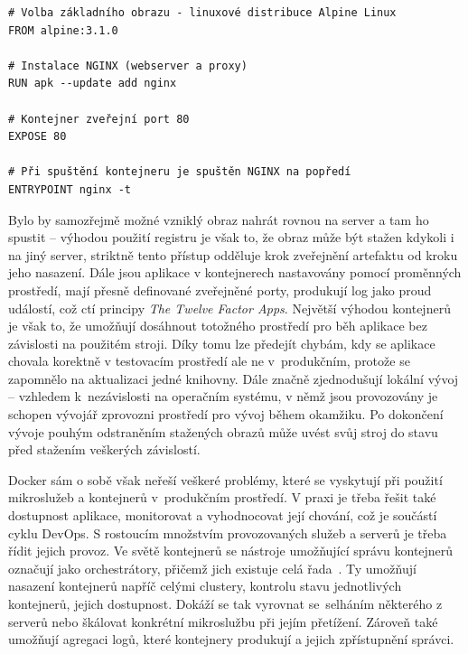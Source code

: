 \documentclass[FM,DP]{tulthesis}
\newenvironment{code}
    {\filbreak\captionsetup{type=listing}}{\filbreak}
\begin{document}
\begin{code}
\captionsetup{singlelinecheck=false,justification=raggedright}
\label{code:dockerfile}
\begin{verbatim}
# Volba základního obrazu - linuxové distribuce Alpine Linux
FROM alpine:3.1.0

# Instalace NGINX (webserver a proxy)
RUN apk --update add nginx

# Kontejner zveřejní port 80
EXPOSE 80

# Při spuštění kontejneru je spuštěn NGINX na popředí
ENTRYPOINT nginx -t
\end{verbatim}
\end{code}

Bylo by samozřejmě možné vzniklý obraz nahrát rovnou na server a tam ho spustit -- výhodou použití registru je však
to, že obraz může být stažen kdykoli i na jiný server, striktně tento přístup odděluje krok zveřejnění artefaktu
od kroku jeho nasazení. Dále jsou aplikace v kontejnerech nastavovány pomocí proměnných prostředí, mají přesně 
definované zveřejněné porty, produkují log jako proud událostí, což ctí principy \textit{The Twelve Factor Apps}. 
Největší výhodou kontejnerů je však to, že umožňují dosáhnout totožného prostředí pro běh aplikace bez závislosti 
na použitém stroji. Díky tomu lze předejít chybám, kdy se aplikace chovala korektně v testovacím prostředí ale ne 
v~produkčním, protože se zapomnělo na aktualizaci jedné knihovny. Dále značně zjednodušují lokální vývoj -- vzhledem 
k~nezávislosti na operačním systému, v němž jsou provozovány je schopen vývojář zprovozni prostředí pro vývoj během 
okamžiku. Po dokončení vývoje pouhým odstraněním stažených obrazů může uvést svůj stroj do stavu před stažením 
veškerých závislostí.

Docker sám o sobě však neřeší veškeré problémy, které se vyskytují při použití mikroslužeb a kontejnerů v~produkčním
prostředí. V praxi je třeba řešit také dostupnost aplikace, monitorovat a vyhodnocovat její chování, což je součástí
cyklu DevOps. S rostoucím množstvím provozovaných služeb a serverů je třeba řídit jejich provoz. Ve světě kontejnerů
se nástroje umožňující správu kontejnerů označují jako orchestrátory, přičemž jich existuje celá řada~\cite[strana~123]{orchestration}. Ty umožňují nasazení kontejnerů napříč celými clustery, kontrolu stavu jednotlivých kontejnerů, 
jejich dostupnost. Dokáží se tak vyrovnat se~selháním některého z serverů nebo škálovat konkrétní mikroslužbu při
jejím přetížení. Zároveň také umožňují agregaci logů, které kontejnery produkují a jejich zpřístupnění správci.
\end{document}
